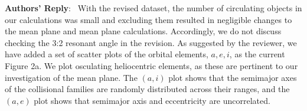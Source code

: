 \documentclass[11pt]{article}
\newcounter{reviewer}
\newenvironment{reply}
   {\medskip \noindent \begin{sf}\textbf{Authors' Reply}:\  }
   {\medskip \end{sf}\medskip}
\newcommand{\edit}[1]{{\color{red}#1}}
\begin{document}
\begin{reply}
With the revised \citet{vokrouhlicky2025orbital} dataset, the number of circulating objects in our calculations was small and excluding them resulted in negligible changes to the mean plane and mean plane calculations.
Accordingly, we do not discuss checking the 3:2 resonant angle in the revision.
As suggested by the reviewer, we have added a set of scatter plots of the orbital elements, $a,e,i$, as the current Figure 2a.
We plot osculating heliocentric elements, as these are pertinent to our investigation of the mean plane.
The $(a,i)$ plot shows that the semimajor axes of the collisional families are randomly distributed across their ranges, and the $(a,e)$ plot shows that semimajor axis and eccentricity are uncorrelated. 

\end{reply}
\end{document}
